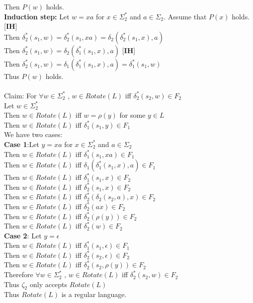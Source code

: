 \documentclass{article}
\begin{document}
\begin{enumerate}
    Then $P(w)$ holds.\\
    \textbf{Induction step:} Let $w = xa$ for $x \in \Sigma_2^\ast$ and $a \in \Sigma_2$. Assume that $P(x)$ holds.[\textbf{IH}]\\
    Then $\delta_2^\ast(s_1, w) = \delta_2^\ast(s_1, xa) = \delta_2(\delta_2^\ast(s_1, x), a) $\\
    Then $\delta_2^\ast(s_1, w) = \delta_2(\delta_1^\ast(s_1, x), a)$ [\textbf{IH}]\\
    Then $\delta_2^\ast(s_1, w) = \delta_1(\delta_1^\ast(s_1, x), a)=\delta_1^\ast(s_1, w)$\\
    Thus $P(w)$ holds.\\\\
    Claim: For $\forall w \in \Sigma_2^\ast$ ,  $w \in Rotate(L)$  iff  $\delta_2^\ast(s_2, w) \in F_2$\\
    Let $w \in \Sigma_2^\ast$ \\
    Then  $w \in Rotate(L)$ iff $w = \rho(y)$ for some $y \in L$\\
    Then  $w \in Rotate(L)$ iff $\delta_1^\ast(s_1, y) \in F_1$\\
    We have two cases:\\
    \textbf{Case 1}:Let $y = xa$ for $x \in \Sigma_2^\ast$ and $a \in \Sigma_2$\\
    Then $w \in Rotate(L)$ iff $\delta_1^\ast(s_1, xa) \in F_1$\\
    Then $w \in Rotate(L)$ iff $\delta_1(\delta_1^\ast(s_1, x), a) \in F_1$\\
    Then $w \in Rotate(L)$ iff $\delta_1^\ast(s_1, x) \in F_2$\\
    Then $w \in Rotate(L)$ iff $\delta_2^\ast(s_1, x) \in F_2$\\
    Then $w \in Rotate(L)$ iff $\delta_2^\ast(\delta_2(s_2,a), x) \in F_2$\\
    Then $w \in Rotate(L)$ iff $\delta_2^\ast(ax) \in F_2$\\
    Then $w \in Rotate(L)$ iff $\delta_2^\ast(\rho(y)) \in F_2$\\
    Then $w \in Rotate(L)$ iff $\delta_2^\ast(w) \in F_2$\\
    \textbf{Case 2}: Let $y = \epsilon$\\
    Then $w \in Rotate(L)$ iff $\delta_1^\ast(s_1, \epsilon) \in F_1$\\
    Then $w \in Rotate(L)$ iff $\delta_2^\ast(s_2, \epsilon) \in F_2$\\
    Then $w \in Rotate(L)$ iff $\delta_2^\ast(s_2, \rho(y)) \in F_2$\\
    Therefore $\forall w \in \Sigma_2^\ast$ ,  $w \in Rotate(L)$  iff  $\delta_2^\ast(s_2, w) \in F_2$\\
    Thus $\zeta_2$ only accepts $Rotate(L)$\\
    Thus $Rotate(L)$ is a regular language.



\end{enumerate}
\end{document}
